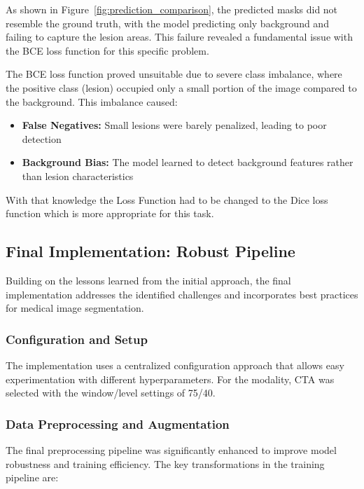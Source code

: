 As shown in Figure~\ref{fig:prediction_comparison}, the predicted masks did not resemble the ground truth, with the model predicting only background and failing to capture the lesion areas. This failure revealed a fundamental issue with the BCE loss function for this specific problem.

The BCE loss function proved unsuitable due to severe class imbalance, where the positive class (lesion) occupied only a small portion of the image compared to the background. This imbalance caused:
\begin{itemize}
    \item \textbf{False Negatives:} Small lesions were barely penalized, leading to poor detection
    \item \textbf{Background Bias:} The model learned to detect background features rather than lesion characteristics
\end{itemize}

With that knowledge the Loss Function had to be changed to the Dice loss function which is more appropriate for this task.

\subsection{Final Implementation: Robust Pipeline}
\label{subsec:final_implementation}

Building on the lessons learned from the initial approach, the final implementation addresses the identified challenges and incorporates best practices for medical image segmentation. 

\subsubsection{Configuration and Setup}
\label{subsubsec:configuration}

The implementation uses a centralized configuration approach that allows easy experimentation with different hyperparameters. 
For the modality, CTA was selected with the window/level settings of 75/40.

\subsubsection{Data Preprocessing and Augmentation}
\label{subsubsec:preprocessing}

The final preprocessing pipeline was significantly enhanced to improve model robustness and training efficiency. The key transformations in the training pipeline are:

